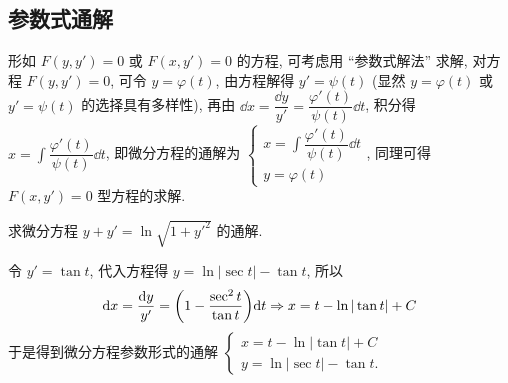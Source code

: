 \subsection{参数式通解}

形如 $F(y,y')=0$ 或 $F(x,y')=0$ 的方程, 可考虑用 “参数式解法” 求解, 对方程 $F(y,y')=0$, 可令 $y=\varphi(t)$, 由方程解得 $y'=\psi(t)$ (显然 $y=\varphi(t)$ 或 $y'=\psi(t)$ 的选择具有多样性), 再由 $\dd x=\dfrac{\dd y}{y'}=\dfrac{\varphi'(t)}{\psi(t)}\dd t$, 积分得 $\displaystyle x=\int\dfrac{\varphi'(t)}{\psi(t)}\dd t$,
即微分方程的通解为 $\begin{cases}
        \displaystyle x=\int\dfrac{\varphi'(t)}{\psi(t)}\dd t \\
        y=\varphi(t)
    \end{cases}$, 同理可得 $F(x,y')=0$ 型方程的求解.

\begin{example}
    求微分方程 $y+y'=\ln\sqrt{1+y'^2}$ 的通解.
\end{example}
\begin{solution}
    令 $y'=\tan t$, 代入方程得 $y=\ln|\sec t|-\tan t$, 所以
    $$
        \dd x=\dfrac{\dd y}{y'}=\qty(1-\dfrac{\sec^2 t}{\tan t})\dd t\Rightarrow x=t-\ln|\tan t|+C
    $$
    于是得到微分方程参数形式的通解 $\begin{cases}
            x=t-\ln|\tan t|+C \\
            y=\ln|\sec t|-\tan t.
        \end{cases}$
\end{solution}